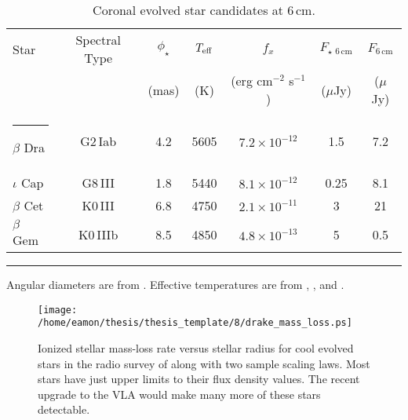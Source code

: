 \begin{table}[hb]
\begin{center}
\caption[Coronal evolved star candidates.]{Coronal evolved star candidates at 6\,cm.}
\begin{tabular}{lcccccc}
\hline
\hline
\rule{0pt}{2.5ex}Star &Spectral Type & $\phi _{\star}$  & $T_{\rm{eff}}$ & $f_{x}$  & $F_{\star \,\,6\,\mathrm{cm}}$ &$F_{6\,\mathrm{cm}}$\\
\rule{0pt}{2.5ex}&  & (mas) & (K) & (erg cm$^{-2}$ s$^{-1}$) & ($\mu$Jy)&($\mu$Jy)\\
\hline
\rule{-2.5pt}{2.5ex}	$\beta$ Dra & G2\,Iab &  4.2 & 5605 & $7.2\times 10^{-12}$& 1.5&7.2\\
					$\iota$ Cap & G8\,III &  1.8 & 5440 & $8.1\times 10^{-12}$ & 0.25&8.1\\
					$\beta$ Cet& K0\,III & 6.8 & 4750 & $2.1\times 10^{-11}$& 3&21\\
					$\beta$ Gem & K0\,IIIb & 8.5 & 4850 & $4.8\times 10^{-13}$&5&0.5\\
\hline
\end{tabular}
\label{tab:8.2}
\begin{minipage}{13.0cm}
\rule{-2.5pt}{2.5ex}{\footnotesize Angular diameters are from \cite{fracassini_1981}. Effective temperatures are from \cite{mcwilliam_1990}, \cite{luck_1995}, and \cite{blackwell_1986}.}
\end{minipage}
\end{center}
\end{table}

\begin{figure}[!hb]
\centering 
        \texttt{[image: /home/eamon/thesis/thesis\_template/8/drake\_mass\_loss.ps]}
\caption[]{Ionized stellar mass-loss rate versus stellar radius for cool evolved stars in the radio survey of \cite{drake_1986} along with two sample scaling laws. Most stars have just upper limits to their flux density values. The recent upgrade to the VLA would make many more of these stars detectable.} 
\label{fig:8.5}
\end{figure}

